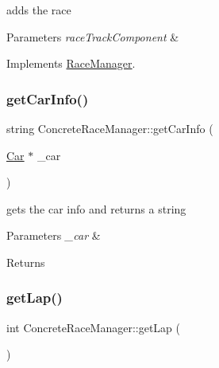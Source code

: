 adds the race 
\begin{DoxyParams}{Parameters}
{\em race\+Track\+Component} & \\
\hline
\end{DoxyParams}


Implements \mbox{\hyperlink{class_race_manager_ae6dda6855a1f976bb46c2b53ad8f29a4}{Race\+Manager}}.

\mbox{\label{class_concrete_race_manager_a54ba28729c97fa5cd19194374bde58e1}} 
\subsubsection{\texorpdfstring{get\+Car\+Info()}{getCarInfo()}}
{\footnotesize\ttfamily string Concrete\+Race\+Manager\+::get\+Car\+Info (\begin{DoxyParamCaption}\item[{\mbox{\hyperlink{class_car}{Car}} $\ast$}]{\+\_\+car }\end{DoxyParamCaption})\hspace{0.3cm}{\ttfamily [inline]}}

gets the car info and returns a string 
\begin{DoxyParams}{Parameters}
{\em \+\_\+car} & \\
\hline
\end{DoxyParams}
\begin{DoxyReturn}{Returns}

\end{DoxyReturn}
\mbox{\label{class_concrete_race_manager_a4a699f41dde54da5c675c4eb00076e79}} 
\subsubsection{\texorpdfstring{get\+Lap()}{getLap()}}
{\footnotesize\ttfamily int Concrete\+Race\+Manager\+::get\+Lap (\begin{DoxyParamCaption}{ }\end{DoxyParamCaption})\hspace{0.3cm}{\ttfamily [inline]}}

